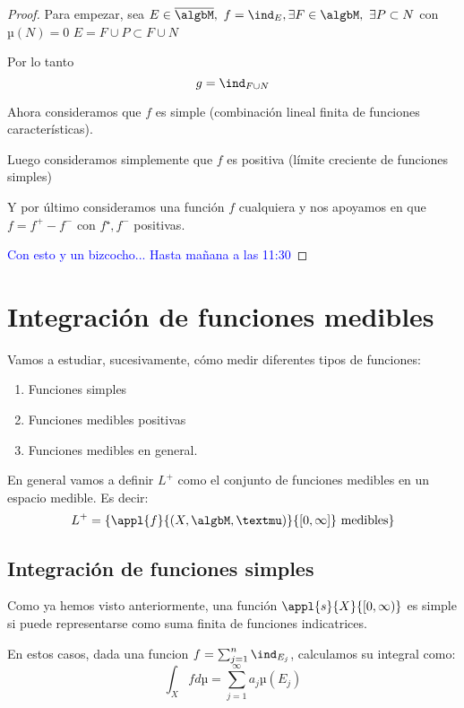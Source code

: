 \documentclass{apuntes}
\begin{document}
\begin{enumerate}
\begin{proof}
Para empezar, sea $E \in \overline{\algbM}, \ f= \ind_E, \exists F \in \algbM, \ \exists P \subset N$ con $µ(N)=0$ $E=F\cup P \subset F \cup N$

Por lo tanto
\[g = \ind_{F \cup N}\]

Ahora consideramos que $f$ es simple (combinación lineal finita de funciones características).

Luego consideramos simplemente que $f$ es positiva (límite creciente de funciones simples)

Y por último consideramos una función $f$ cualquiera y nos apoyamos en que $f= f^+-f^-$ con $f⁺, f^-$ positivas.

\textcolor{blue}{Con esto y un bizcocho... Hasta mañana a las 11:30}
\end{proof}
\end{enumerate}

\chapter{Integración de funciones medibles}
Vamos a estudiar, sucesivamente, cómo medir diferentes tipos de funciones:
\begin{enumerate}
\item Funciones simples
\item Funciones medibles positivas
\item Funciones medibles en general.
\end{enumerate}

En general vamos a definir $L^+$ como el conjunto de funciones medibles en un espacio medible. Es decir:
\[L^+ = \{\appl{f}{(X, \algbM, µ)}{[0, \infty]} \text{ medibles}\}\]

\section{Integración de funciones simples}
Como ya hemos visto anteriormente, una función $\appl{s}{X}{[0, \infty)}$ es simple si puede representarse como suma finita de funciones indicatrices.

En estos casos, dada una funcion $f=\sum_{j=1}^{n}\ind_{E_j}$, calculamos su integral como:
\[\int_X f dµ = \sum_{j=1}^{\infty}a_jµ(E_j)\]
\end{document}
